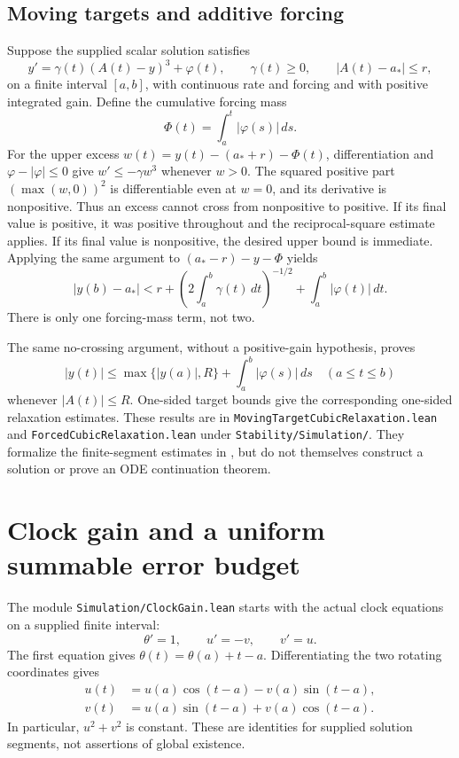 \documentclass[11pt]{article}
\newcommand{\code}[1]{{\small\nolinkurl{#1}}}
\begin{document}
\subsection{Moving targets and additive forcing}

Suppose the supplied scalar solution satisfies
\[
 y'=\gamma(t)(A(t)-y)^3+\varphi(t),\qquad
 \gamma(t)\ge0,\qquad |A(t)-a_*|\le r,
\]
on a finite interval $[a,b]$, with continuous rate and forcing and with
positive integrated gain. Define the cumulative forcing mass
\[
 \Phi(t)=\int_a^t|\varphi(s)|\,ds.
\]
For the upper excess $w(t)=y(t)-(a_*+r)-\Phi(t)$, differentiation and
$\varphi-|\varphi|\le0$ give $w'\le-\gamma w^3$ whenever $w>0$.
The squared positive part $(\max(w,0))^2$ is differentiable even at
$w=0$, and its derivative is nonpositive. Thus an excess cannot cross
from nonpositive to positive. If its final value is positive, it was
positive throughout and the reciprocal-square estimate applies. If its
final value is nonpositive, the desired upper bound is immediate. Applying
the same argument to $(a_*-r)-y-\Phi$ yields
\[
 |y(b)-a_*|<r+\left(2\int_a^b\gamma(t)\,dt\right)^{-1/2}
            +\int_a^b|\varphi(t)|\,dt.
\]
There is only one forcing-mass term, not two.

The same no-crossing argument, without a positive-gain hypothesis, proves
\[
 |y(t)|\le\max\{|y(a)|,R\}+\int_a^b|\varphi(s)|\,ds
 \quad(a\le t\le b)
\]
whenever $|A(t)|\le R$. One-sided target bounds give the corresponding
one-sided relaxation estimates. These results are in
\code{MovingTargetCubicRelaxation.lean} and
\code{ForcedCubicRelaxation.lean} under \code{Stability/Simulation/}.
They formalize the finite-segment estimates in
\cite[Lemma 4.1]{korda}, but do not themselves construct a solution or
prove an ODE continuation theorem.

\section{Clock gain and a uniform summable error budget}

The module \code{Simulation/ClockGain.lean} starts with the actual clock
equations on a supplied finite interval:
\[
 \theta'=1,\qquad u'=-v,\qquad v'=u.
\]
The first equation gives $\theta(t)=\theta(a)+t-a$. Differentiating the
two rotating coordinates gives
\[
 \begin{split}
 u(t)&=u(a)\cos(t-a)-v(a)\sin(t-a),\\
 v(t)&=u(a)\sin(t-a)+v(a)\cos(t-a).
 \end{split}
\]
In particular, $u^2+v^2$ is constant. These are identities for supplied
solution segments, not assertions of global existence.
\end{document}
